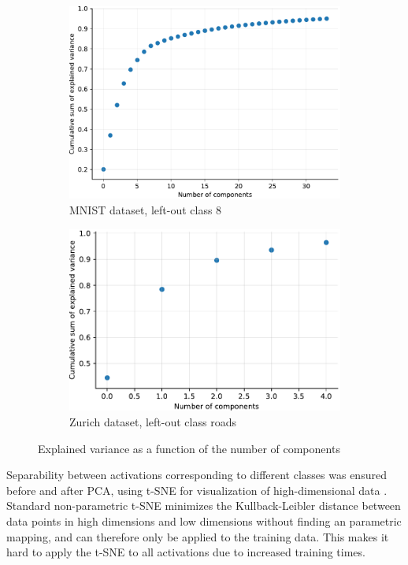 \documentclass[10pt]{article}
\begin{document}
\begin{figure}[H]
    \centering
    \begin{subfigure}{.45\textwidth}
        \centering
        \includegraphics[width=\textwidth]{MNIST_pca_components_wo_cl_8}
        \caption{MNIST dataset, left-out class 8}
        \label{fig:pca_components_mnist}
    \end{subfigure}
    \begin{subfigure}{.45\textwidth}
        \centering
        \includegraphics[width=\textwidth]{ZH_pca_components_wo_cl_1}
        \caption{Zurich dataset, left-out class roads}
        \label{fig:pca_components_zurich}
    \end{subfigure}
    \caption{Explained variance as a function of the number of components}
    \label{fig:pca_components}
\end{figure}
Separability between activations corresponding to different classes was ensured before and after \gls{PCA}, using \gls{t-SNE} for visualization of high-dimensional data \cite{Maaten2008VisualizingDU}. Standard non-parametric \gls{t-SNE} minimizes the Kullback-Leibler distance between data points in high dimensions and low dimensions without finding an parametric mapping, and can therefore only be applied to the training data. This makes it hard to apply the \gls{t-SNE} to all activations due to increased training times.
\end{document}
